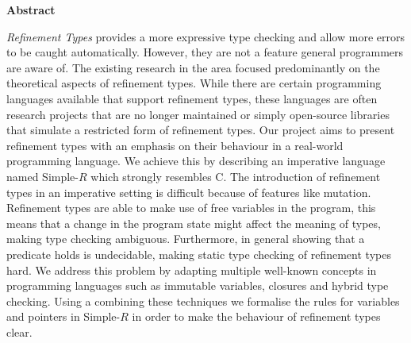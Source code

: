 \newpage
{\Huge \bf Abstract}
\vspace{24pt} 

\emph{Refinement Types} provides a more expressive type checking and allow more errors to be caught automatically. However, they are not a feature general programmers are aware of. The existing research in the area focused predominantly on the theoretical aspects of refinement types. While there are certain programming languages available that support refinement types, these languages are often research projects that are no longer maintained or simply open-source libraries that simulate a restricted form of refinement types. Our project aims to present refinement types with an emphasis on their behaviour in a real-world programming language. We achieve this by describing an imperative language named Simple-$R$ which strongly resembles C. The introduction of refinement types in an imperative setting is difficult because of features like mutation. Refinement types are able to make use of free variables in the program, this means that a change in the program state might affect the meaning of types, making type checking ambiguous. Furthermore, in general showing that a predicate holds is undecidable, making static type checking of refinement types hard. We address this problem by adapting multiple well-known concepts in programming languages such as immutable variables, closures and hybrid type checking. Using a combining these techniques we formalise the rules for variables and pointers in Simple-$R$ in order to make the behaviour of refinement types clear. 

\newpage
\vspace*{\fill}

